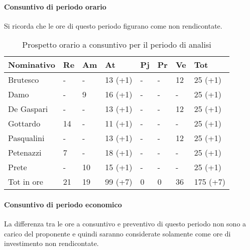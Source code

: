 			\paragraph{Consuntivo di periodo orario}
			Si ricorda che le ore di questo periodo figurano come non rendicontate.
								\begin{table}[H] \begin{center} \begin{tabular}{llllllll}
								\toprule
								\textbf{Nominativo}	&	\textbf{Re}		&	\textbf{Am}		&	\textbf{At}		&	\textbf{Pj}		&	\textbf{Pr}		&	\textbf{Ve}		&	\textbf{Tot}		 \\
								\midrule																						 
								Brutesco	&	-		&	-		&	13	(+1)	&	-		&	-		&	12		&	25	(+1)\\
								Damo		&	-		&	9		&	16	(+1)	&	-		&	-		&	-		&	25	(+1)\\
								De Gaspari	&	-		&	-		&	13	(+1)	&	-		&	-		&	12		&	25	(+1)\\
								Gottardo	&	14		&	-		&	11	(+1)	&	-		&	-		&	-		&	25	(+1)\\
								Pasqualini	&	-		&	-		&	13	(+1)	&	-		&	-		&	12		&	25	(+1)\\
								Petenazzi	&	7		&	-		&	18	(+1)	&	-		&	-		&	-		&	25	(+1)\\
								Prete		&	-		&	10		&	15	(+1)	&	-		&	-		&	-		&	25	(+1)\\
								\midrule																					
								Tot in ore	&	21		&	19		&	99	(+7)	&	0		&	0		&	36		&	175	(+7)\\
								\bottomrule
								\end{tabular} \end{center} \caption{Prospetto orario a consuntivo per il periodo di analisi}\label{tab:oreAnalisiCons}
									\end{table}
			\paragraph{Consuntivo di periodo economico}
			La differenza tra le ore a consuntivo e preventivo di questo periodo non sono a carico del proponente e quindi saranno considerate solamente come ore di investimento non rendicontate.


